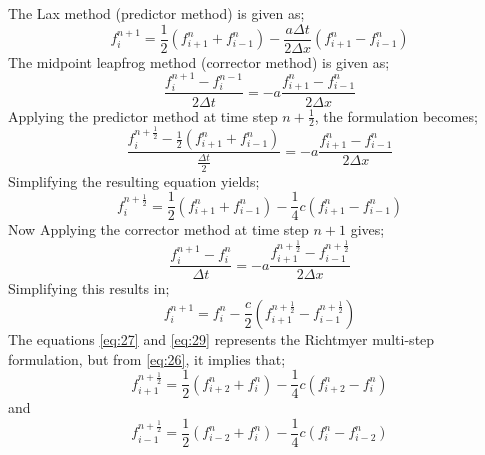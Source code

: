 The Lax method (predictor method) is given as;
\begin{equation}
f^{n+1}_{i} = \frac{1}{2}(f^{n}_{i+1} + f^{n}_{i-1}) - \frac{a\Delta t}{2\Delta x}(f^{n}_{i+1} - f^{n}_{i-1}) \label{eq:25}
\end{equation}
The midpoint leapfrog method (corrector method) is given as;
\begin{equation}
\frac{f^{n+1}_{i} - f^{n-1}_{i}}{2\Delta t} = -a \frac{f^{n}_{i+1} - f^{n}_{i-1}}{2 \Delta x} \label{eq:26}
\end{equation}
Applying the predictor method at time step $ n+\frac{1}{2} $, the formulation becomes;
\begin{equation}
\frac{f^{n+\frac{1}{2}}_{i} - \frac{1}{2}(f^{n}_{i+1}+f^{n}_{i-1})}{\frac{\Delta t}{2}} = -a \frac{f^{n}_{i+1} - f^{n}_{i-1}}{2 \Delta x} \label{eq:27}
\end{equation}
Simplifying the resulting equation yields;
\begin{equation}
\boxed{ f^{n+\frac{1}{2}}_{i} = \frac{1}{2} \left(f^{n}_{i+1} + f^{n}_{i-1}\right) - \frac{1}{4}c\left(f^{n}_{i+1} - f^{n}_{i-1}\right) } \label{eq:28}
\end{equation}
Now Applying the corrector method at time step $n+1$ gives;
\begin{equation}
\frac{f^{n+1}_{i} - f^{n}_{i}}{\Delta t} = -a \frac{f^{n+\frac{1}{2}}_{i+1} - f^{n+\frac{1}{2}}_{i-1}}{2 \Delta x} \label{eq:29}
\end{equation}
Simplifying this results in;
\begin{equation}
\boxed{f^{n+1}_{i} = f^{n}_{i} - \frac{c}{2}\left(f^{n+\frac{1}{2}}_{i+1} - f^{n+\frac{1}{2}}_{i-1}\right)} \label{eq:30}
\end{equation}
The equations \eqref{eq:27} and \eqref{eq:29} represents the Richtmyer multi-step formulation, but from \eqref{eq:26}, it implies that;
\begin{equation}
 f^{n+\frac{1}{2}}_{i+1} = \frac{1}{2} \left(f^{n}_{i+2} + f^{n}_{i}\right) - \frac{1}{4}c\left(f^{n}_{i+2} - f^{n}_{i}\right) \label{eq:31}
\end{equation}
and
\begin{equation}
f^{n+\frac{1}{2}}_{i-1} = \frac{1}{2} \left(f^{n}_{i-2} + f^{n}_{i}\right) - \frac{1}{4}c\left(f^{n}_{i} - f^{n}_{i-2}\right) \label{eq:32}
\end{equation}